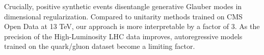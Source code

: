Crucially, positive synthetic events disentangle generative Glauber
modes in dimensional regularization. Compared to unitarity methods
trained on CMS Open Data at 13 TeV, our approach is more interpretable
by a factor of 3. As the precision of the High-Luminosity LHC data
improves, autoregressive models trained on the quark/gluon dataset
become a limiting factor.

